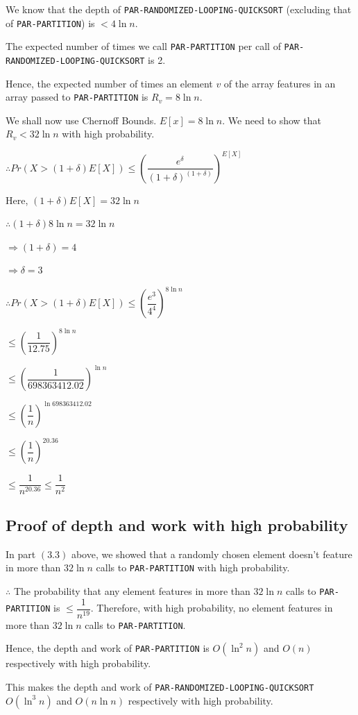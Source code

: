 \documentclass{article}
\begin{document}
We know that the depth of \texttt{PAR-RANDOMIZED-LOOPING-QUICKSORT}
(excluding that of \texttt{PAR-PARTITION}) is $< 4\ln{n}$.

The expected number of times we call \texttt{PAR-PARTITION} per call
of \texttt{PAR-RANDOMIZED-LOOPING-QUICKSORT} is 2.

Hence, the expected number of times an element $v$ of the array
features in an array passed to \texttt{PAR-PARTITION} is $R_v =
8\ln{n}$.

We shall now use Chernoff Bounds. $E[x] = 8\ln{n}$. We need to show
that $R_v < 32\ln{n}$ with high probability.

$\therefore Pr(X > (1 + \delta)E[X]) \le 
\left(\dfrac{e^\delta}{(1+\delta)^{(1+\delta)}}\right)^{E[X]}$

Here, $(1 + \delta)E[X] = 32\ln{n}$

$\therefore (1+\delta)8\ln{n} = 32\ln{n}$

$\Rightarrow (1+\delta) = 4$

$\Rightarrow \delta = 3$

$\therefore Pr(X > (1 + \delta)E[X]) \le 
\left(\dfrac{e^3}{4^4}\right)^{8\ln{n}}$

$\le \left(\dfrac{1}{12.75}\right)^{8\ln{n}}$

$\le \left(\dfrac{1}{698363412.02}\right)^{\ln{n}}$

$\le \left(\dfrac{1}{n}\right)^{\ln{698363412.02}}$

$\le \left(\dfrac{1}{n}\right)^{20.36}$

$\le \dfrac{1}{n^{20.36}} \le \dfrac{1}{n^{2}}$

\subsection{Proof of depth and work with high probability}

In part $(3.3)$ above, we showed that a randomly chosen element
doesn't feature in more than $32\ln{n}$ calls to
\texttt{PAR-PARTITION} with high probability.

$\therefore$ The probability that any element features in more
than $32\ln{n}$ calls to \texttt{PAR-PARTITION} is $\le
\dfrac{1}{n^{19}}$. Therefore, with high probability, no element
features in more than $32\ln{n}$ calls to \texttt{PAR-PARTITION}.

Hence, the depth and work of \texttt{PAR-PARTITION} is $O(\ln^2{n})$
and $O(n)$ respectively with high probability.

This makes the depth and work of
\texttt{PAR-RANDOMIZED-LOOPING-QUICKSORT} $O(\ln^3{n})$ and
$O(n\ln{n})$ respectively with high probability.
\end{document}
